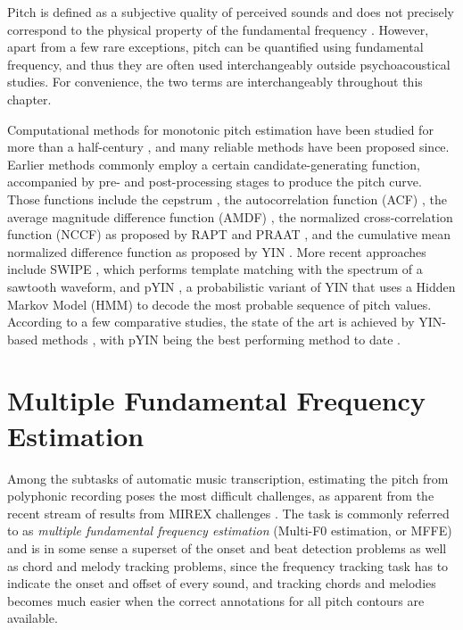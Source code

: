 Pitch is defined as a subjective quality of perceived sounds and does not precisely correspond to the physical property of the fundamental frequency \cite{hartmann1997signals}.
However, apart from a few rare exceptions, pitch can be quantified using fundamental frequency, and thus they are often used interchangeably outside psychoacoustical studies. 
For convenience, the two terms are interchangeably throughout this chapter.

Computational methods for monotonic pitch estimation have been studied for more than a half-century \cite{noll1967cepstrum}, and many reliable methods have been proposed since.
Earlier methods commonly employ a certain candidate-generating function, accompanied by pre- and post-processing stages to produce the pitch curve.
Those functions include the cepstrum \cite{noll1967cepstrum}, the autocorrelation function (ACF) \cite{dubnowski1976acf}, the average magnitude difference function (AMDF) \cite{ross1974amdf}, the normalized cross-correlation function (NCCF) as proposed by RAPT \cite{talkin1995rapt} and PRAAT \cite{boersma1993praat}, and the cumulative mean normalized difference function as proposed by YIN \cite{decheveigne2002yin}. More recent approaches include SWIPE \cite{camacho2008swipe}, which performs template matching with the spectrum of a sawtooth waveform, and 
pYIN \cite{mauch2014pyin}, a probabilistic variant of YIN that uses a Hidden Markov Model (HMM) to decode the most probable sequence of pitch values.
According to a few comparative studies, the state of the art is achieved by YIN-based methods \cite{von2010comparison, babacan2013comparative}, with pYIN being the best performing method to date \cite{mauch2014pyin}.


\section{Multiple Fundamental Frequency Estimation}

Among the subtasks of automatic music transcription, estimating the pitch from polyphonic recording poses the most difficult challenges, as apparent from the recent stream of results from MIREX challenges \cite{downie2014mirex}.
The task is commonly referred to as \emph{multiple fundamental frequency estimation} (Multi-F0 estimation, or MFFE) and is in some sense a superset of the onset and beat detection problems as well as chord and melody tracking problems,
since the frequency tracking task has to indicate the onset and offset of every sound, and tracking chords and melodies becomes much easier when the correct annotations for all pitch contours are available.

